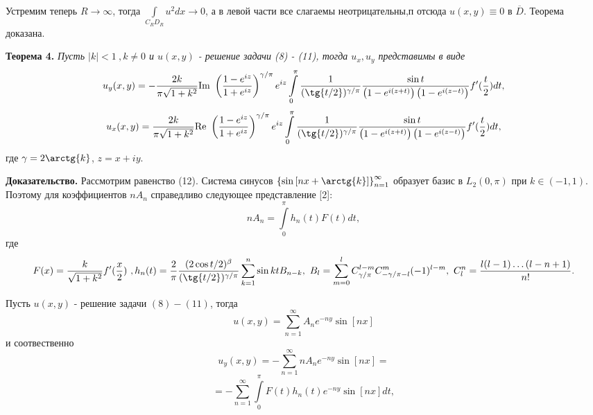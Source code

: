 \documentclass[9pt]{article}
\begin{document}
Устремим теперь $R \to \infty$, тогда $\int\limits_{C_RD_R} u^2 dx \to 0$, а в левой части все слагаемы неотрицательны,п отсюда $u(x,y) \equiv 0$ в $\overline{D}$. Теорема доказана.
\par
\textbf{Теорема 4.} \textit{Пусть $|k| < 1\  , k \neq 0$ и $u(x,y)$  - решение задачи (8) - (11), тогда $u_x, u_y$ представимы в виде}
\begin{equation*}
		u_y(x,y) = -\dfrac{2k}{\pi\sqrt{1+k^2}} \mathrm{Im}\ \left(\dfrac{1- e^{iz}}{1 + e^{iz}} \right)^{\gamma/\pi} e^{iz}\int\limits_0^\pi \dfrac{1}{(\tg{t/2})^{\gamma/\pi}}  \dfrac{ \sin{t}}{\left(1 - e^{i(z+t)} \right) \left(1 - e^{i(z-t)}\right)}  f'(\dfrac{t}{2}) dt, 
\end{equation*}
\begin{equation*}
	u_x(x,y) = \dfrac{2k}{\pi\sqrt{1+k^2}} \mathrm{Re}\ \left(\dfrac{1- e^{iz}}{1 + e^{iz}} \right)^{\gamma/\pi} e^{iz}\int\limits_0^\pi \dfrac{1}{(\tg{t/2})^{\gamma/\pi}}  \dfrac{ \sin{t}}{\left(1 - e^{i(z+t)} \right) \left(1 - e^{i(z-t)}\right)}  f'(\dfrac{t}{2}) dt,
\end{equation*}
где $\gamma = 2\arctg{k}$, $z = x + iy$.
\par
\textbf{Доказательство.} Рассмотрим равенство (12). Система синусов $\left\{\sin{\left[nx + \arctg{k}\right]}\right\}_{n=1}^{\infty}$ образует базис в $L_2(0,\pi)$ при $k \in (-1, 1)$. Поэтому для коэффициентов $nA_n$ справедливо следующее представление [2]:
\begin{equation*}
	nA_n = \int\limits_0^\pi h_{n}(t) F(t)dt, 
\end{equation*}
где
\begin{equation*}
	F(x) = \dfrac{k}{\sqrt{1+k^2}} f'(\dfrac{x}{2})\ , h_n(t) = \dfrac{2}{\pi}\dfrac{(2\cos{t/2})^\beta}{(\tg{t/2})^{\gamma/\pi}} \sum\limits_{k=1}^n \sin{kt} B_{n-k}, \ B_{l} = \sum\limits_{m=0}^{l} C_{\gamma/\pi}^{l-m} C_{-\gamma / \pi -l}^{m} (-1)^{l-m}, \ C_l^n = \dfrac{l(l-1)\dots (l-n+1)}{n!}. 
\end{equation*}
\par
Пусть $u(x,y)$ - решение задачи $(8) - (11)$, тогда
\begin{equation*}
	u(x,y) = \sum\limits_{n=1}^{\infty} A_n e^{-ny} \sin{\left[nx\right]}
\end{equation*}
и соотвественно
\begin{equation*}
	u_y(x,y) = -\sum\limits_{n=1}^{\infty} nA_n e^{-ny} \sin{\left[nx\right]}=
\end{equation*}
\begin{equation*}
	= - \sum\limits_{n=1}^{\infty}  \int\limits_0^\pi F(t)  h_{n}(t)  e^{-ny} \sin{\left[nx\right]} dt, 
\end{equation*}
\end{document}
